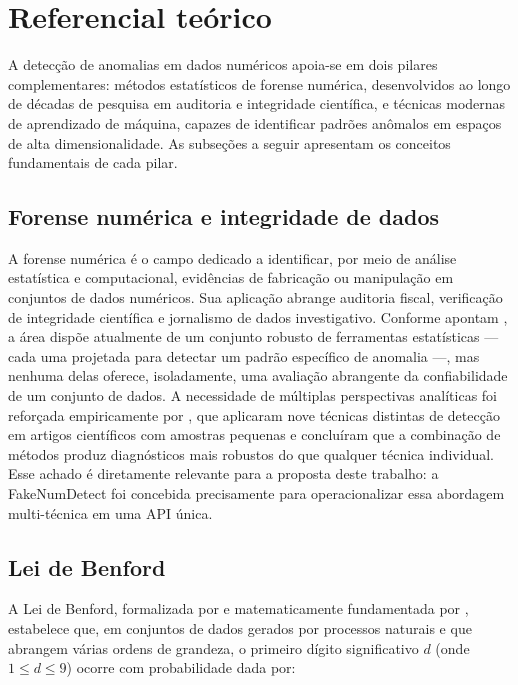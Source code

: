 \documentclass[
    12pt,                %
    openright,           %
    oneside,             %
    a4paper,             %
    english,             %
    brazil               %
]{abntex2}
\begin{document}
\section{Referencial teórico}
\label{sec:referencial}

A detecção de anomalias em dados numéricos apoia-se em dois pilares complementares: métodos estatísticos de forense numérica, desenvolvidos ao longo de décadas de pesquisa em auditoria e integridade científica, e técnicas modernas de aprendizado de máquina, capazes de identificar padrões anômalos em espaços de alta dimensionalidade. As subseções a seguir apresentam os conceitos fundamentais de cada pilar.

\subsection{Forense numérica e integridade de dados}

A forense numérica é o campo dedicado a identificar, por meio de análise estatística e computacional, evidências de fabricação ou manipulação em conjuntos de dados numéricos. Sua aplicação abrange auditoria fiscal, verificação de integridade científica e jornalismo de dados investigativo. Conforme apontam , a área dispõe atualmente de um conjunto robusto de ferramentas estatísticas — cada uma projetada para detectar um padrão específico de anomalia —, mas nenhuma delas oferece, isoladamente, uma avaliação abrangente da confiabilidade de um conjunto de dados.
A necessidade de múltiplas perspectivas analíticas foi reforçada empiricamente por , que aplicaram nove técnicas distintas de detecção em artigos científicos com amostras pequenas e concluíram que a combinação de métodos produz diagnósticos mais robustos do que qualquer técnica individual. Esse achado é diretamente relevante para a proposta deste trabalho: a FakeNumDetect foi concebida precisamente para operacionalizar essa abordagem multi-técnica em uma API única.

\subsection{Lei de Benford}

A Lei de Benford, formalizada por  e matematicamente fundamentada por , estabelece que, em conjuntos de dados gerados por processos naturais e que abrangem várias ordens de grandeza, o primeiro dígito significativo \(d\) (onde \(1 \leq d \leq 9\)) ocorre com probabilidade dada por:
\end{document}
